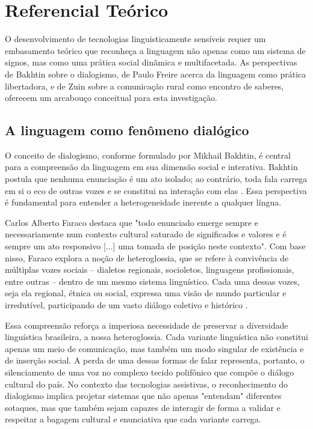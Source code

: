 \chapter{Referencial Teórico}

O desenvolvimento de tecnologias linguisticamente sensíveis requer um embasamento teórico que reconheça a linguagem não apenas como um sistema de signos, mas como uma prática social dinâmica e multifacetada. As perspectivas de Bakhtin sobre o dialogismo, de Paulo Freire acerca da linguagem como prática libertadora, e de Zuin sobre a comunicação rural como encontro de saberes, oferecem um arcabouço conceitual para esta investigação.

\section{A linguagem como fenômeno dialógico}
O conceito de dialogismo, conforme formulado por Mikhail Bakhtin, é central para a compreensão da linguagem em sua dimensão social e interativa. Bakhtin postula que nenhuma enunciação é um ato isolado; ao contrário, toda fala carrega em si o eco de outras vozes e se constitui na interação com elas \cite{bakhtin1997estetica}. Essa perspectiva é fundamental para entender a heterogeneidade inerente a qualquer língua.

Carlos Alberto Faraco destaca que "todo enunciado emerge sempre e necessariamente num contexto cultural saturado de significados e valores e é sempre um ato responsivo [...] uma tomada de posição neste contexto". Com base nisso, Faraco explora a noção de heteroglossia, que se refere à convivência de múltiplas vozes sociais – dialetos regionais, socioletos, linguagens profissionais, entre outras – dentro de um mesmo sistema linguístico. Cada uma dessas vozes, seja ela regional, étnica ou social, expressa uma visão de mundo particular e irredutível, participando de um vasto diálogo coletivo e histórico \cite{faraco2009}.

Essa compreensão reforça a imperiosa necessidade de preservar a diversidade linguística brasileira, a nossa heteroglossia. Cada variante linguística não constitui apenas um meio de comunicação, mas também um modo singular de existência e de inserção social. A perda de uma dessas formas de falar representa, portanto, o silenciamento de uma voz no complexo tecido polifônico que compõe o diálogo cultural do país. No contexto das tecnologias assistivas, o reconhecimento do dialogismo implica projetar sistemas que não apenas "entendam" diferentes sotaques, mas que também sejam capazes de interagir de forma a validar e respeitar a bagagem cultural e enunciativa que cada variante carrega.



